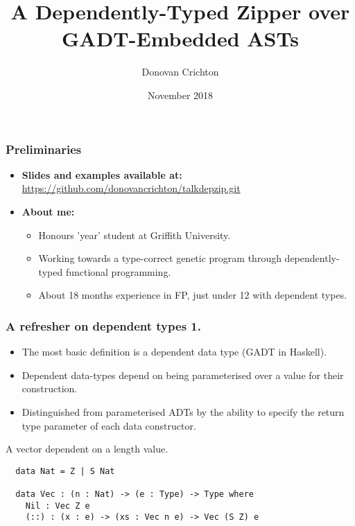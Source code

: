 \documentclass{beamer}
\title{A Dependently-Typed Zipper over GADT-Embedded ASTs}
\author{Donovan Crichton}
\date{November 2018}
\begin{document}
 
\frame{\titlepage}

\begin{frame}[fragile]
  \frametitle{Preliminaries}
  \begin{itemize}
    \item \textbf{Slides and examples available at:}
    \url{https://github.com/donovancrichton/talkdepzip.git}
  \item \textbf{About me:}
    \begin{itemize}
      \item Honours 'year' student at Griffith University.
      \item Working towards a type-correct genetic program through
              dependently-typed functional programming.
      \item About 18 months experience in FP, just under 12 with
              dependent types.
    \end{itemize}
  \end{itemize}
\end{frame}

\begin{frame}[fragile]
\frametitle{A refresher on dependent types 1.}
\begin{itemize}
  \item The most basic definition is a dependent data type (GADT in
          Haskell).
  \item Dependent data-types depend on being parameterised over a
        value for their construction.
  \item Distinguished from parameterised ADTs by the ability to
        specify the return type parameter of each data constructor.
\end{itemize}
\begin{minipage}{0.5\textwidth}
\begin{block}{A vector dependent on a length value.}
\begin{verbatim}
  data Nat = Z | S Nat

  data Vec : (n : Nat) -> (e : Type) -> Type where
    Nil : Vec Z e
    (::) : (x : e) -> (xs : Vec n e) -> Vec (S Z) e
\end{verbatim}
\end{block}
\end{minipage}
\end{frame}
\end{document}
